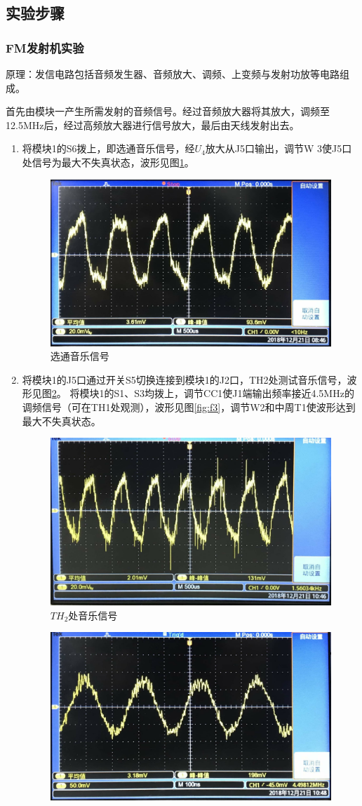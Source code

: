 \documentclass[12pt]{article}%
\numberwithin{equation}{section}
\begin{document}
\subsection{实验步骤}
\subsubsection{FM发射机实验}\label{yl:section}
原理：发信电路包括音频发生器、音频放大、调频、上变频与发射功放等电路组成。\par
首先由模块一产生所需发射的音频信号。经过音频放大器将其放大，调频至 12.5MHz后，经过高频放大器进行信号放大，最后由天线发射出去。 \par
\begin{enumerate}[1.]\addtolength{\itemsep}{-1.5ex}
\item 将模块1的S6拨上，即选通音乐信号，经$U_4$放大从J5口输出，调节W 3使J5口处信号为最大不失真状态，波形见图\ref{fig:f1}。
 \begin{figure}[htbp]
  \centering
  \includegraphics[width=.45\textwidth]{gaopin6/gaopin603.jpg}
  \caption{选通音乐信号 } 
  \label{fig:f1} 
\end{figure}
\item 将模块1的J5口通过开关S5切换连接到模块1的J2口，TH2处测试音乐信号，波形见图\ref{fig:f2}。
将模块1的S1、S3均拨上，调节CC1使J1端输出频率接近4.5MHz的调频信号（可在TH1处观测），波形见图\ref{fig:f3}，调节W2和中周T1使波形达到最大不失真状态。
 \begin{figure}[htbp]
  \centering
  \includegraphics[width=.45\textwidth]{gaopin6/gaopin608.jpg}
  \caption{$TH_2$处音乐信号 } 
  \label{fig:f2} 
\end{figure}
 \begin{figure}[htbp]
  \centering
  \includegraphics[width=.45\textwidth]{gaopin6/gaopin604.jpg}

\end{figure}
\end{enumerate}
\end{document}

